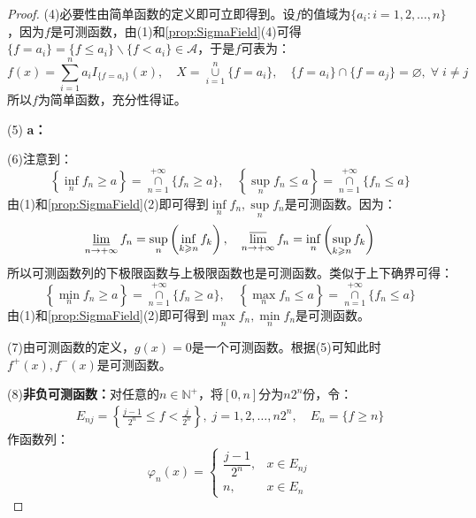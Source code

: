 \begin{proof}
	(4)必要性由简单函数的定义即可立即得到。设$f$的值域为$\{a_i:i=1,2,\dots,n\}$，因为$f$是可测函数，由(1)和\cref{prop:SigmaField}(4)可得$\{f=a_i\}=\{f\leqslant a_i\}\backslash\{f<a_i\}\in\mathscr{A}$，于是$f$可表为：
	\begin{equation*}
		f(x)=\sum_{i=1}^{n}a_iI_{\{f=a_i\}}(x),\quad X=\underset{i=1}{\overset{n}{\cup}}\{f=a_i\},\quad\{f=a_i\}\cap\{f=a_j\}=\varnothing,\;\forall\;i\ne j
	\end{equation*}
	所以$f$为简单函数，充分性得证。\par
	(5)\textbf{ a：}\par
	(6)注意到：
	\begin{equation*}
		\left\{\inf_nf_n\geqslant a\right\}=\underset{n=1}{\overset{+\infty}{\cap}}\{f_n\geqslant a\},\quad\left\{\sup_nf_n\leqslant a\right\}=\underset{n=1}{\overset{+\infty}{\cap}}\{f_n\leqslant a\}
	\end{equation*}
	由(1)和\cref{prop:SigmaField}(2)即可得到$\inf\limits_nf_n,\sup\limits_nf_n$是可测函数。因为：
	\begin{equation*}
		\varliminf_{n\to+\infty}f_n=\sup_{n}\left(\inf_{k\geqslant n}f_k\right),\quad\varlimsup_{n\to+\infty}f_n=\inf_{n}\left(\sup_{k\geqslant n}f_k\right)
	\end{equation*}
	所以可测函数列的下极限函数与上极限函数也是可测函数。类似于上下确界可得：
	\begin{equation*}
		\left\{\min_nf_n\geqslant a\right\}=\underset{n=1}{\overset{+\infty}{\cap}}\{f_n\geqslant a\},\quad\left\{\max_nf_n\leqslant a\right\}=\underset{n=1}{\overset{+\infty}{\cap}}\{f_n\leqslant a\}
	\end{equation*}
	由(1)和\cref{prop:SigmaField}(2)即可得到$\max\limits_nf_n,\min\limits_nf_n$是可测函数。\par
	(7)由可测函数的定义，$g(x)=0$是一个可测函数。根据(5)可知此时$f^+(x),f^-(x)$是可测函数。\par
	(8)\textbf{非负可测函数：}对任意的$n\in\mathbb{N}^+$，将$[0,n]$分为$n2^n$份，令：
	\begin{gather*}
		E_{nj}=\left\{\frac{j-1}{2^n}\leqslant f<\frac{j}{2^n}\right\},\;j=1,2,\dots,n2^n ,\quad E_n=\{f\geqslant n\}
	\end{gather*}
	作函数列：
	\begin{equation*}
		\varphi_n(x)=
		\begin{cases}
			\dfrac{j-1}{2^n},&x\in E_{nj} \\
			n,&x\in E_n
		\end{cases}
	\end{equation*}

\end{proof}
